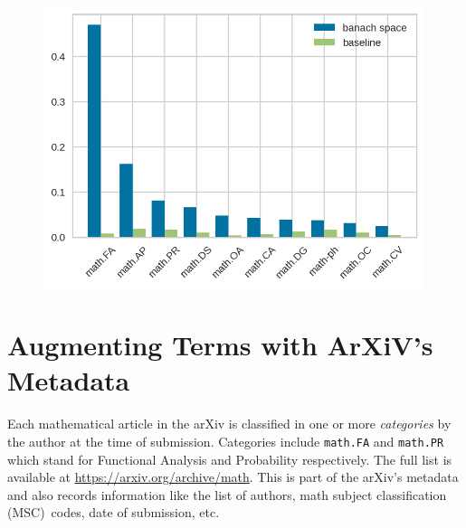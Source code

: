 \documentclass[submission,copyright,creativecommons]{eptcs}
\begin{document}
\begin{figure}[h!]
\begin{minipage}{0.4\textwidth}
\end{minipage}\hfill
\begin{minipage}{0.55\textwidth}
    \centering
    \includegraphics[width=0.99\textwidth]{barcomp.png}
\end{minipage}
\end{figure}


\section{Augmenting Terms with ArXiV's Metadata}
Each mathematical article in the arXiv is classified in one or more
\emph{categories}  by the author at
the time of submission. Categories include \texttt{math.FA} and  \texttt{math.PR} which stand for Functional Analysis and Probability respectively. The full list is available at \url{https://arxiv.org/archive/math}.
This is part of  the arXiv's metadata and also records information like the list of authors, math subject classification (MSC)~codes, date of submission, etc. 
\end{document}
